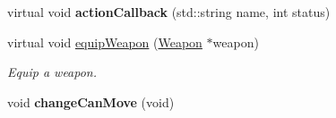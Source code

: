 \begin{DoxyCompactItemize}
\item 
\hypertarget{class_characters_a76e565eca6d40dc04119697e1218d24d}{virtual void {\bfseries action\-Callback} (std\-::string name, int status)}\label{class_characters_a76e565eca6d40dc04119697e1218d24d}

\item 
virtual void \hyperlink{class_characters_a99ea3219f0784f29306bfe539301b83a}{equip\-Weapon} (\hyperlink{class_weapon}{Weapon} $\ast$weapon)
\begin{DoxyCompactList}\small\item\em Equip a weapon. \end{DoxyCompactList}\item 
\hypertarget{class_characters_a542fa5bfc689011ccc0c4cc4edc9d32a}{void {\bfseries change\-Can\-Move} (void)}\label{class_characters_a542fa5bfc689011ccc0c4cc4edc9d32a}

\end{DoxyCompactItemize}
